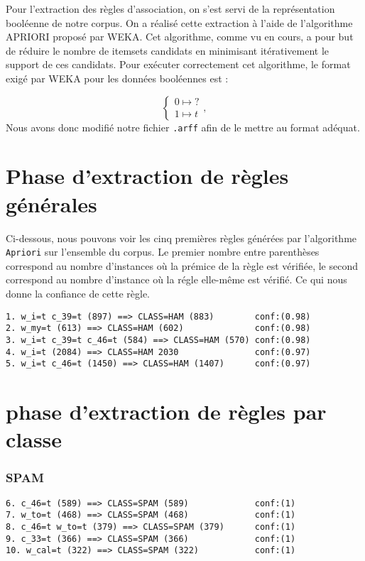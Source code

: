
Pour l'extraction des règles d'association, on s'est servi de la représentation booléenne de notre corpus. On a réalisé cette extraction à l'aide de l'algorithme APRIORI proposé par WEKA. Cet algorithme, comme vu en cours, a pour but de réduire le nombre de itemsets candidats en minimisant itérativement le support de ces candidats. Pour exécuter correctement cet algorithme, le format exigé par WEKA pour les données booléennes est : 

\begin{displaymath}
\begin{cases}
      0 \mapsto ? \\
      1 \mapsto t
\end{cases},
\end{displaymath} 
Nous avons donc modifié notre fichier \texttt{.arff} afin de le mettre au format adéquat. 



\section{Phase d'extraction de règles générales}

Ci-dessous, nous pouvons voir les cinq premières règles générées par l'algorithme \texttt{Apriori} sur l'ensemble du corpus. Le premier nombre entre parenthèses correspond au nombre d'instances où la prémice de la règle est vérifiée, le second correspond au nombre d'instance où la régle elle-même est vérifié. Ce qui nous donne la confiance de cette règle. 

\begin{verbatim}
1. w_i=t c_39=t (897) ==> CLASS=HAM (883)        conf:(0.98)
2. w_my=t (613) ==> CLASS=HAM (602)              conf:(0.98)
3. w_i=t c_39=t c_46=t (584) ==> CLASS=HAM (570) conf:(0.98)
4. w_i=t (2084) ==> CLASS=HAM 2030               conf:(0.97)
5. w_i=t c_46=t (1450) ==> CLASS=HAM (1407)      conf:(0.97)
\end{verbatim}

\section{phase d'extraction de règles par classe}

\subsubsection{SPAM}

\begin{verbatim}
6. c_46=t (589) ==> CLASS=SPAM (589)             conf:(1)
7. w_to=t (468) ==> CLASS=SPAM (468)             conf:(1)
8. c_46=t w_to=t (379) ==> CLASS=SPAM (379)      conf:(1)
9. c_33=t (366) ==> CLASS=SPAM (366)             conf:(1)
10. w_cal=t (322) ==> CLASS=SPAM (322)           conf:(1)
\end{verbatim}


